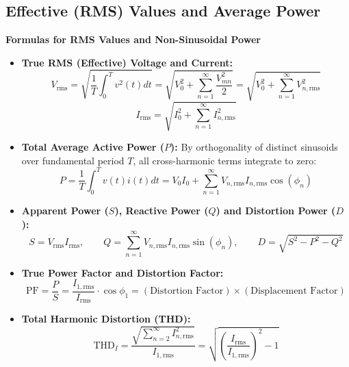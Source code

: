 \documentclass[12pt,a4paper]{article}
\begin{document}
\subsection{Effective (RMS) Values and Average Power}

\textbf{Formulas for RMS Values and Non-Sinusoidal Power}
\begin{itemize}[leftmargin=*, itemsep=3pt]
  \item \textbf{True RMS (Effective) Voltage and Current:}
  \begin{equation}
    V_{\text{rms}} = \sqrt{\frac{1}{T}\int_0^T v^2(t) dt} = \sqrt{V_0^2 + \sum_{n=1}^\infty \frac{V_{mn}^2}{2}} = \sqrt{V_0^2 + \sum_{n=1}^\infty V_{n,\text{rms}}^2}
  \end{equation}
  \begin{equation}
    I_{\text{rms}} = \sqrt{I_0^2 + \sum_{n=1}^\infty I_{n,\text{rms}}^2}
  \end{equation}
  \item \textbf{Total Average Active Power ($P$):} By orthogonality of distinct sinusoids over fundamental period $T$, all cross-harmonic terms integrate to zero:
  \begin{equation}
    P = \frac{1}{T}\int_0^T v(t) i(t) dt = V_0 I_0 + \sum_{n=1}^\infty V_{n,\text{rms}} I_{n,\text{rms}} \cos(\phi_n)
  \end{equation}
  \item \textbf{Apparent Power ($S$), Reactive Power ($Q$) and Distortion Power ($D$):}
  \begin{equation}
    S = V_{\text{rms}} I_{\text{rms}}, \qquad Q = \sum_{n=1}^\infty V_{n,\text{rms}} I_{n,\text{rms}} \sin(\phi_n), \qquad D = \sqrt{S^2 - P^2 - Q^2}
  \end{equation}
  \item \textbf{True Power Factor and Distortion Factor:}
  \begin{equation}
    \text{PF} = \frac{P}{S} = \frac{I_{1,\text{rms}}}{I_{\text{rms}}} \cdot \cos\phi_1 = (\text{Distortion Factor}) \times (\text{Displacement Factor})
  \end{equation}
  \item \textbf{Total Harmonic Distortion (THD):}
  \begin{equation}
    \text{THD}_I = \frac{\sqrt{\sum_{n=2}^\infty I_{n,\text{rms}}^2}}{I_{1,\text{rms}}} = \sqrt{\left(\frac{I_{\text{rms}}}{I_{1,\text{rms}}}\right)^2 - 1}
  \end{equation}
\end{itemize}
\end{document}
